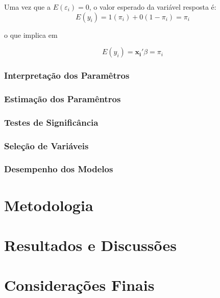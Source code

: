 \documentclass[
	12pt,				%
	openright,			%
	oneside,      %
	a4paper,			%
	english,			%
	french,				%
	spanish,			%
	brazil,				%
	]{abntex2}\usepackage[]{graphicx}\usepackage[]{xcolor}
\begin{document}
Uma vez que a $E(\varepsilon_i) = 0$, o valor esperado da variável resposta é:
\begin{equation}
  E(y_i) = 1(\pi_i) + 0(1 - \pi_i)= \pi_i
\end{equation}

\noindent o que implica em 


$$
E(y_i) = \mathbf{x_i'}\beta = \pi_i
$$

      \subsection{Interpretação dos Paramêtros}




      \subsection{Estimação dos Paramêntros}





      \subsection{Testes de Significância}





      \subsection{Seleção de Variáveis}




      \subsection{Desempenho dos Modelos}


\chapter{Metodologia}






\chapter{Resultados e Discussões}





\chapter{Considerações Finais}
\end{document}
